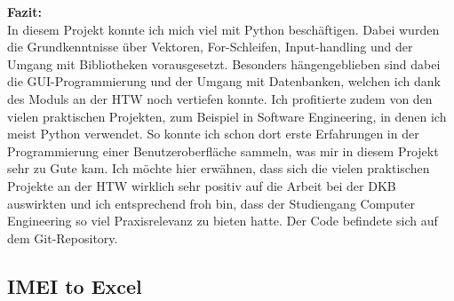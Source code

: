 \noindent
\textbf{Fazit:}
\\ 

\noindent
In diesem Projekt konnte ich mich viel mit Python beschäftigen. Dabei wurden die Grundkenntnisse über Vektoren, For-Schleifen, Input-handling und der Umgang mit Bibliotheken vorausgesetzt. Besonders hängengeblieben sind dabei die GUI-Programmierung und der Umgang mit Datenbanken, welchen ich dank des Moduls an der HTW noch vertiefen konnte. Ich profitierte zudem von den vielen praktischen Projekten, zum Beispiel in Software Engineering, in denen ich meist Python verwendet. So konnte ich schon dort erste Erfahrungen in der Programmierung einer Benutzeroberfläche sammeln, was mir in diesem Projekt sehr zu Gute kam. Ich möchte hier erwähnen, dass sich die vielen praktischen Projekte an der HTW wirklich sehr positiv auf die Arbeit bei der DKB auswirkten und ich entsprechend froh bin, dass der Studiengang Computer Engineering so viel Praxisrelevanz zu bieten hatte. Der Code befindete sich auf dem Git-Repository.

\subsection{IMEI to Excel}
\label{IMEI to Excel}

